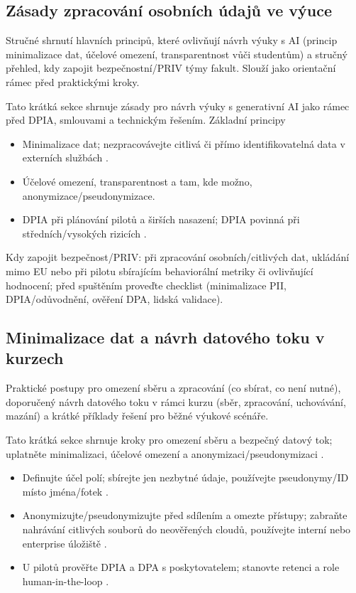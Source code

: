 \documentclass{report}%
\begin{document}
\subsection{Zásady zpracování osobních údajů ve výuce}%
Stručné shrnutí hlavních principů, které ovlivňují návrh výuky s AI (princip minimalizace dat, účelové omezení, transparentnost vůči studentům) a stručný přehled, kdy zapojit bezpečnostní/PRIV týmy fakult. Slouží jako orientační rámec před praktickými kroky.%


%
Tato krátká sekce shrnuje zásady pro návrh výuky s generativní AI jako rámec před DPIA, smlouvami a technickým řešením.
Základní principy
\begin{itemize}
  \item Minimalizace dat; nezpracovávejte citlivá či přímo identifikovatelná data v externích službách \cite{kb_ai_101_tipu_pdf_04e4a115_page_8_1}.
  \item Účelové omezení, transparentnost a tam, kde možno, anonymizace/pseudonymizace.
  \item DPIA při plánování pilotů a širších nasazení; DPIA povinná při středních/vysokých rizicích \cite{kb_malinka_chatgpt_ve_vyuce_dva_roky_pote_2024_pdf_90bc3aaf_page_12_1}.
\end{itemize}
Kdy zapojit bezpečnost/PRIV: při zpracování osobních/citlivých dat, ukládání mimo EU nebo při pilotu sbírajícím behaviorální metriky či ovlivňující hodnocení; před spuštěním proveďte checklist (minimalizace PII, DPIA/odůvodnění, ověření DPA, lidská validace).%

%
\subsection{Minimalizace dat a návrh datového toku v kurzech}%
Praktické postupy pro omezení sběru a zpracování (co sbírat, co není nutné), doporučený návrh datového toku v rámci kurzu (sběr, zpracování, uchovávání, mazání) a krátké příklady řešení pro běžné výukové scénáře.%


%
Tato krátká sekce shrnuje kroky pro omezení sběru a bezpečný datový tok; uplatněte minimalizaci, účelové omezení a anonymizaci/pseudonymizaci \cite{kb_ai_101_tipu_pdf_04e4a115_page_8_1}.

\begin{itemize}
  \item Definujte účel polí; sbírejte jen nezbytné údaje, používejte pseudonymy/ID místo jména/fotek \cite{kb_ai_101_tipu_pdf_04e4a115_page_8_1}.
  \item Anonymizujte/pseudonymizujte před sdílením a omezte přístupy; zabraňte nahrávání citlivých souborů do neověřených cloudů, používejte interní nebo enterprise úložiště \cite{kb_ai_101_tipu_pdf_04e4a115_page_8_1, kb_ai_101_tipu_pdf_04e4a115_page_53_2}.
  \item U pilotů prověřte DPIA a DPA s poskytovatelem; stanovte retenci a role human-in-the-loop \cite{kb_malinka_chatgpt_ve_vyuce_dva_roky_pote_2024_pdf_90bc3aaf_page_12_1}.
\end{itemize}
\end{document}
